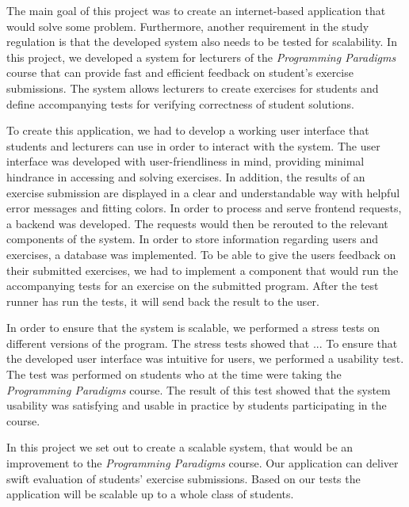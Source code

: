 The main goal of this project was to create an internet-based application that would solve some problem.
Furthermore, another requirement in the study regulation is that the developed system also needs to be tested for scalability. 
In this project, we developed a system for lecturers of the \textit{Programming Paradigms} course that can provide fast and efficient feedback on student's exercise submissions.
The system allows lecturers to create exercises for students and define accompanying tests for verifying correctness of student solutions.

To create this application, we had to develop a working user interface that students and lecturers can use in order to interact with the system. 
The user interface was developed with user-friendliness in mind, providing minimal hindrance in accessing and solving exercises. 
In addition, the results of an exercise submission are displayed in a clear and understandable way with helpful error messages and fitting colors.
In order to process and serve frontend requests, a backend was developed.
The requests would then be rerouted to the relevant components of the system. 
In order to store information regarding users and exercises, a database was implemented.
To be able to give the users feedback on their submitted exercises, we had to implement a component that would run the accompanying tests for an exercise on the submitted program. 
After the test runner has run the tests, it will send back the result to the user.

In order to ensure that the system is scalable, we performed a stress tests on different versions of the program.
The stress tests showed that ... 
To ensure that the developed user interface was intuitive for users, we performed a usability test.
The test was performed on students who at the time were taking the \textit{Programming Paradigms} course.
The result of this test showed that the system usability was satisfying and usable in practice by students participating in the course.

In this project we set out to create a scalable system, that would be an improvement to the \textit{Programming Paradigms} course.
Our application can deliver swift evaluation of students' exercise submissions. Based on our tests the application will be scalable up to a whole class of students.
